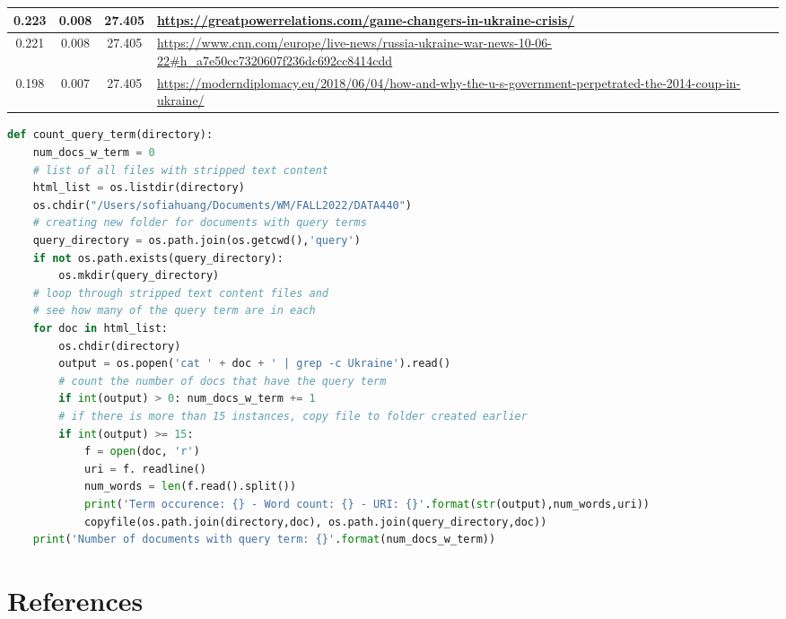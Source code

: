 \documentclass[12pt]{article}
\begin{document}
\begin{center}
\begin{adjustbox}{width=\textwidth}
\begin{tabular}{ |c|c|c|p{12cm}| }
            \hline
            0.223 & 0.008 & 27.405 &  \url{https://greatpowerrelations.com/game-changers-in-ukraine-crisis/}\\ 
            \hline
            0.221 & 0.008 & 27.405 &  \url{https://www.cnn.com/europe/live-news/russia-ukraine-war-news-10-06-22#h_a7e50cc7320607f236dc692cc8414cdd}\\ 
            \hline
            0.198 & 0.007 & 27.405 &  \url{https://moderndiplomacy.eu/2018/06/04/how-and-why-the-u-s-government-perpetrated-the-2014-coup-in-ukraine/}\\ 
            \hline
        \end{tabular}
    \end{adjustbox}
\end{center}


\begin{lstlisting}[language=Python, caption=Obtaining files containing the query term "Ukraine", label=lst:copy]
def count_query_term(directory):
    num_docs_w_term = 0
    # list of all files with stripped text content
    html_list = os.listdir(directory)
    os.chdir("/Users/sofiahuang/Documents/WM/FALL2022/DATA440")
    # creating new folder for documents with query terms
    query_directory = os.path.join(os.getcwd(),'query')
    if not os.path.exists(query_directory):
        os.mkdir(query_directory)
    # loop through stripped text content files and 
    # see how many of the query term are in each
    for doc in html_list:
        os.chdir(directory)
        output = os.popen('cat ' + doc + ' | grep -c Ukraine').read()
        # count the number of docs that have the query term
        if int(output) > 0: num_docs_w_term += 1
        # if there is more than 15 instances, copy file to folder created earlier
        if int(output) >= 15:
            f = open(doc, 'r')
            uri = f. readline()
            num_words = len(f.read().split())
            print('Term occurence: {} - Word count: {} - URI: {}'.format(str(output),num_words,uri))
            copyfile(os.path.join(directory,doc), os.path.join(query_directory,doc))
    print('Number of documents with query term: {}'.format(num_docs_w_term))
\end{lstlisting}


\section*{References}
\end{document}
